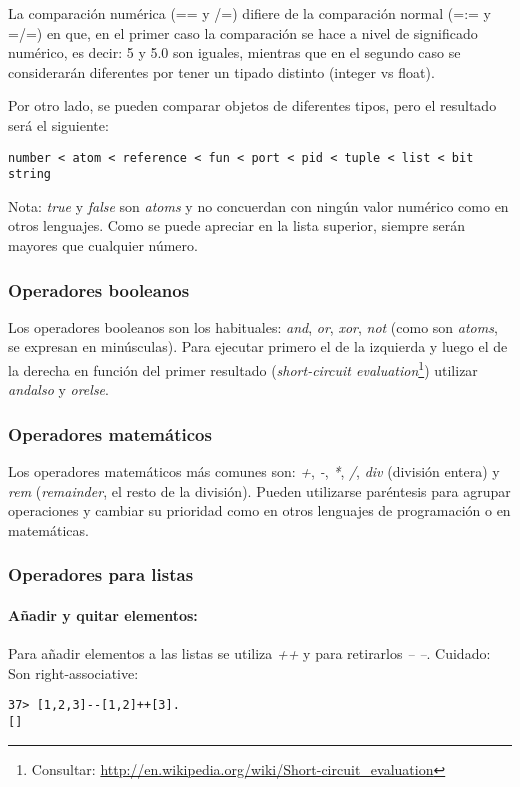 La comparación numérica (== y /=) difiere de la comparación normal (=:= y =/=) en que, en el primer caso la
comparación se hace a nivel de significado numérico, es decir: 5 y 5.0 son iguales, mientras que en el
segundo caso se considerarán diferentes por tener un tipado distinto (integer vs float).

Por otro lado, se pueden comparar objetos de diferentes tipos, pero el resultado será el siguiente:
\begin{verbatim}
number < atom < reference < fun < port < pid < tuple < list < bit string
\end{verbatim}

Nota: \textit{true} y \textit{false} son \textit{atoms} y no concuerdan con ningún valor numérico como en
otros lenguajes. Como se puede apreciar en la lista superior, siempre serán mayores que cualquier número.

\subsubsection{Operadores booleanos}

Los operadores booleanos son los habituales: \textit{and}, \textit{or}, \textit{xor}, \textit{not} (como
son \textit{atoms}, se expresan en minúsculas). Para ejecutar primero el de la izquierda y luego el de la
derecha en función del primer resultado (\textit{short-circuit evaluation}\footnote{Consultar:
\url{http://en.wikipedia.org/wiki/Short-circuit_evaluation}}) utilizar \textit{andalso} y \textit{orelse}.


\subsubsection{Operadores matemáticos}

Los operadores matemáticos más comunes son: \textit{+}, \textit{-}, \textit{*}, \textit{/}, \textit{div}
(división entera) y \textit{rem} (\textit{remainder}, el resto de la división). Pueden utilizarse paréntesis
para agrupar operaciones y cambiar su prioridad como en otros lenguajes de programación o en matemáticas.

\subsubsection{Operadores para listas}
\paragraph{Añadir y quitar elementos:} Para añadir elementos a las listas se utiliza \textit{++} y para
retirarlos \textit{-- --}. Cuidado: Son right-associative:
\begin{lstlisting}
37> [1,2,3]--[1,2]++[3].
[]
\end{lstlisting}


